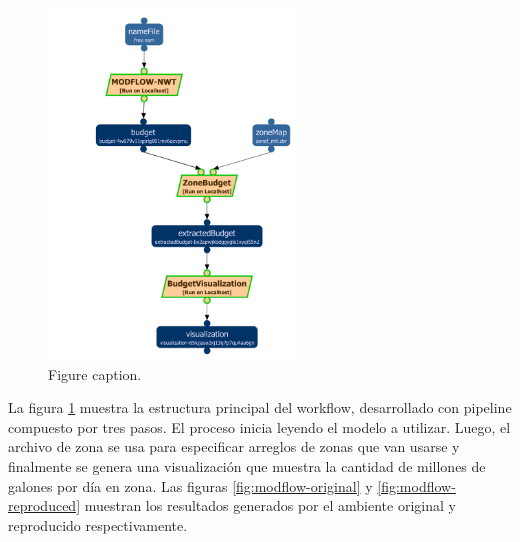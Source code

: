 \begin{figure}[t]
\centering
\includegraphics[width=0.6\textwidth]{Figures/usgs-modflow-nwt}
\caption{Figure caption.}\label{fig:modflow}
\end{figure}


La figura \ref{fig:modflow} muestra la estructura principal del workflow, desarrollado con pipeline compuesto por tres pasos. El proceso inicia leyendo el modelo a utilizar. Luego, el archivo de zona se usa para especificar arreglos de zonas que van usarse y finalmente se genera una visualización que muestra la cantidad de millones de galones por día en zona. Las figuras \ref{fig:modflow-original} y \ref{fig:modflow-reproduced} muestran los resultados generados por el ambiente original y reproducido respectivamente.

